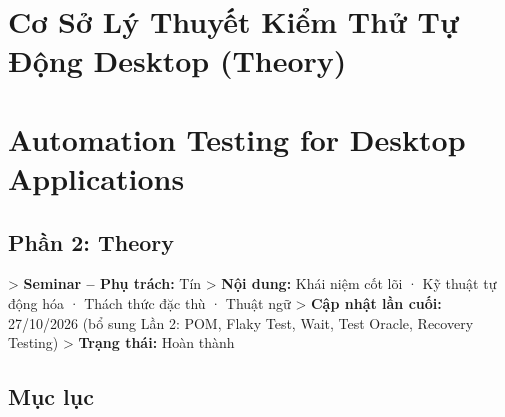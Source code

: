 \section{Cơ Sở Lý Thuyết Kiểm Thử Tự Động Desktop (Theory)}

\section{Automation Testing for Desktop Applications}
\subsection{Phần 2: Theory}

> \textbf{Seminar – Phụ trách:} Tín  
> \textbf{Nội dung:} Khái niệm cốt lõi · Kỹ thuật tự động hóa · Thách thức đặc thù · Thuật ngữ  
> \textbf{Cập nhật lần cuối:} 27/10/2026 (bổ sung Lần 2: POM, Flaky Test, Wait, Test Oracle, Recovery Testing)  
> \textbf{Trạng thái:} Hoàn thành  


\subsection{Mục lục}

